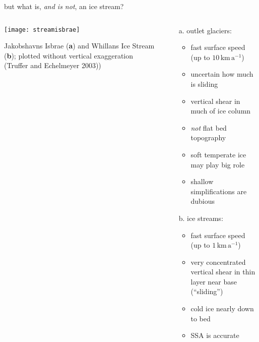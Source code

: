 \begin{frame}{but what is, \emph{and is not}, an ice stream?}

\begin{columns}
\begin{column}{0.4\textwidth}
\texttt{[image: streamisbrae]}

\bigskip
\scriptsize 
Jakobshavns Isbrae (\textbf{a}) and Whillans Ice Stream (\textbf{b}); plotted without vertical exaggeration (\tiny Truffer and Echelmeyer 2003)\scriptsize)
\end{column}
\begin{column}{0.6\textwidth}
\begin{itemize}
\item[a.] outlet glaciers:
  \begin{itemize}
  \item fast surface speed (up to $10 \,\text{km}\,\text{a}^{-1}$)
  \item uncertain how much is sliding
  \item vertical shear in much of ice column
  \item \emph{not} flat bed topography
  \item soft temperate ice may play big role
  \item \alert{shallow simplifications are dubious}
  \end{itemize}

\medskip
\item[b.] ice streams:
  \small
  \begin{itemize}
  \item fast surface speed (up to $1 \,\text{km}\,\text{a}^{-1}$)
  \item very concentrated vertical shear in thin layer near base (``sliding'')
  \item cold ice nearly down to bed
  \item SSA is accurate
  \end{itemize}
  \normalsize
\end{itemize}
\end{column}
\end{columns}
\end{frame}


